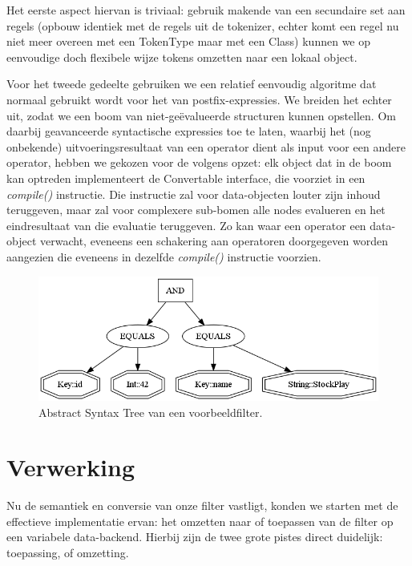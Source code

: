 Het eerste aspect hiervan is triviaal: gebruik makende van een secundaire set aan regels (opbouw identiek met de regels uit de tokenizer, echter komt een regel nu niet meer overeen met een TokenType maar met een Class) kunnen we op eenvoudige doch flexibele wijze tokens omzetten naar een lokaal object.

Voor het tweede gedeelte gebruiken we een relatief eenvoudig algoritme dat normaal gebruikt wordt voor het  van postfix-expressies. We breiden het echter uit, zodat we een boom van niet-ge\"evalueerde structuren kunnen opstellen. Om daarbij geavanceerde syntactische expressies toe te laten, waarbij het (nog onbekende) uitvoeringsresultaat van een operator dient als input voor een andere operator, hebben we gekozen voor de volgens opzet: elk object dat in de boom kan optreden implementeert de Convertable interface, die voorziet in een \emph{compile()} instructie. Die instructie zal voor data-objecten louter zijn inhoud teruggeven, maar zal voor complexere sub-bomen alle nodes evalueren en het eindresultaat van die evaluatie teruggeven. Zo kan waar een operator een data-object verwacht, eveneens een schakering aan operatoren doorgegeven worden aangezien die eveneens in dezelfde \emph{compile()} instructie voorzien.

\begin{figure}[h!]
	\centering
		\includegraphics[width=\textwidth]{images/realisatie/AST}
	\caption{Abstract Syntax Tree van een voorbeeldfilter.}
\end{figure}


\section{Verwerking}

Nu de semantiek en conversie van onze filter vastligt, konden we starten met de effectieve implementatie ervan: het omzetten naar of toepassen van de filter op een variabele data-backend. Hierbij zijn de twee grote pistes direct duidelijk: toepassing, of omzetting.

